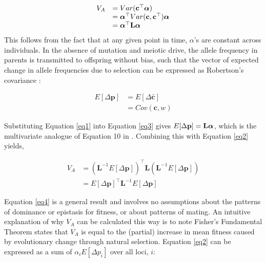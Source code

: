 \documentclass[12pt]{article}
\begin{document}
\begin{bibunit}
\begin{equation} \label{eq2}
\begin{array}{rl} 
{V_A} &= Var({\bf c}^{\top}\boldsymbol{{\alpha}}) \\ 
&= \boldsymbol{{\alpha}}^{\top}Var({\bf c}, {\bf c}^{\top})\boldsymbol{{\alpha}}\\ 
&= \boldsymbol{\alpha}^{\top}\textbf{L}\boldsymbol{\alpha}\\
\end{array}
\end{equation}
This follows from the fact that at any given point in time, $\alpha$'s are constant across individuals. In the absence of mutation and meiotic drive, the allele frequency in parents is transmitted to offspring without bias, such that the vector of expected change in allele frequencies due to selection can be expressed as Robertson's covariance \citep{robertson1966mathematical, price1970selection, queller2017fundamental}:

\begin{equation} \label{eq3}
\begin{array}{rl}
E[\Delta{\textbf{p}}] &= E[\Delta\bar{{\textbf{c}}}]\\
&= Cov(\textbf{c}, w)
\end{array}
\end{equation}

Substituting Equation \ref{eq1} into Equation \ref{eq3} gives $E[\Delta{\textbf{p}}] = {\bf L}\boldsymbol{\alpha}$, which is the multivariate analogue of Equation 10 in \citet{Kirkpatrick.2002}. Combining this with Equation \ref{eq2} yields,

\begin{equation} \label{eq4}
\begin{array}{rl}
{V_A} &= \left({\textbf{L}^{-1}E[\Delta{\textbf{p}}]}\right)^{\top}{\textbf{L}}\left({\textbf{L}^{-1}E[\Delta{\textbf{p}}]}\right)\\
&= E[\Delta{\textbf{p}}]^{\top}{\textbf{L}^{-1}}E[\Delta{\textbf{p}}]
\end{array}
\end{equation}

Equation \ref{eq4} is a general result and involves no assumptions about the patterns of dominance or epistasis for fitness, or about patterns of mating. An intuitive explanation of why $V_A$ can be calculated this way is to note Fisher's Fundamental Theorem states that ${V_A}$ is equal to the (partial) increase in mean fitness caused by evolutionary change through natural selection. Equation \ref{eq2} can be expressed as a sum of $\alpha_i E[\Delta p_i]$ over all loci, $i$:


\end{bibunit}
\end{document}
